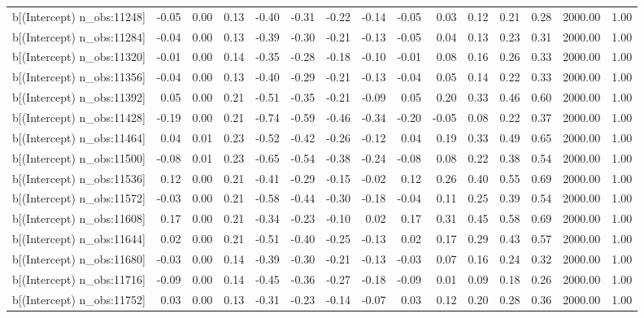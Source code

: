 \begin{table}[ht]
\begin{tabular}{rrrrrrrrrrrrrrr}
  b[(Intercept) n\_obs:11248] & -0.05 & 0.00 & 0.13 & -0.40 & -0.31 & -0.22 & -0.14 & -0.05 & 0.03 & 0.12 & 0.21 & 0.28 & 2000.00 & 1.00 \\ 
  b[(Intercept) n\_obs:11284] & -0.04 & 0.00 & 0.13 & -0.39 & -0.30 & -0.21 & -0.13 & -0.05 & 0.04 & 0.13 & 0.23 & 0.31 & 2000.00 & 1.00 \\ 
  b[(Intercept) n\_obs:11320] & -0.01 & 0.00 & 0.14 & -0.35 & -0.28 & -0.18 & -0.10 & -0.01 & 0.08 & 0.16 & 0.26 & 0.33 & 2000.00 & 1.00 \\ 
  b[(Intercept) n\_obs:11356] & -0.04 & 0.00 & 0.13 & -0.40 & -0.29 & -0.21 & -0.13 & -0.04 & 0.05 & 0.14 & 0.22 & 0.33 & 2000.00 & 1.00 \\ 
  b[(Intercept) n\_obs:11392] & 0.05 & 0.00 & 0.21 & -0.51 & -0.35 & -0.21 & -0.09 & 0.05 & 0.20 & 0.33 & 0.46 & 0.60 & 2000.00 & 1.00 \\ 
  b[(Intercept) n\_obs:11428] & -0.19 & 0.00 & 0.21 & -0.74 & -0.59 & -0.46 & -0.34 & -0.20 & -0.05 & 0.08 & 0.22 & 0.37 & 2000.00 & 1.00 \\ 
  b[(Intercept) n\_obs:11464] & 0.04 & 0.01 & 0.23 & -0.52 & -0.42 & -0.26 & -0.12 & 0.04 & 0.19 & 0.33 & 0.49 & 0.65 & 2000.00 & 1.00 \\ 
  b[(Intercept) n\_obs:11500] & -0.08 & 0.01 & 0.23 & -0.65 & -0.54 & -0.38 & -0.24 & -0.08 & 0.08 & 0.22 & 0.38 & 0.54 & 2000.00 & 1.00 \\ 
  b[(Intercept) n\_obs:11536] & 0.12 & 0.00 & 0.21 & -0.41 & -0.29 & -0.15 & -0.02 & 0.12 & 0.26 & 0.40 & 0.55 & 0.69 & 2000.00 & 1.00 \\ 
  b[(Intercept) n\_obs:11572] & -0.03 & 0.00 & 0.21 & -0.58 & -0.44 & -0.30 & -0.18 & -0.04 & 0.11 & 0.25 & 0.39 & 0.54 & 2000.00 & 1.00 \\ 
  b[(Intercept) n\_obs:11608] & 0.17 & 0.00 & 0.21 & -0.34 & -0.23 & -0.10 & 0.02 & 0.17 & 0.31 & 0.45 & 0.58 & 0.69 & 2000.00 & 1.00 \\ 
  b[(Intercept) n\_obs:11644] & 0.02 & 0.00 & 0.21 & -0.51 & -0.40 & -0.25 & -0.13 & 0.02 & 0.17 & 0.29 & 0.43 & 0.57 & 2000.00 & 1.00 \\ 
  b[(Intercept) n\_obs:11680] & -0.03 & 0.00 & 0.14 & -0.39 & -0.30 & -0.21 & -0.13 & -0.03 & 0.07 & 0.16 & 0.24 & 0.32 & 2000.00 & 1.00 \\ 
  b[(Intercept) n\_obs:11716] & -0.09 & 0.00 & 0.14 & -0.45 & -0.36 & -0.27 & -0.18 & -0.09 & 0.01 & 0.09 & 0.18 & 0.26 & 2000.00 & 1.00 \\ 
  b[(Intercept) n\_obs:11752] & 0.03 & 0.00 & 0.13 & -0.31 & -0.23 & -0.14 & -0.07 & 0.03 & 0.12 & 0.20 & 0.28 & 0.36 & 2000.00 & 1.00 \\ 

\end{tabular}
\end{table}

